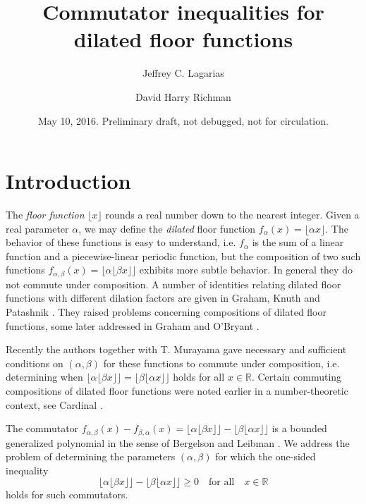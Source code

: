 \documentclass[12pt,letterpaper, reqno]{amsart}
\title{ Commutator inequalities for dilated floor functions}
\author{Jeffrey C. Lagarias}
\author{David Harry Richman}
\date{May 10, 2016. Preliminary draft, not debugged, not for circulation.}
\theoremstyle{definition}
\theoremstyle{remark}
\newcommand{\RR}{\ensuremath{\mathbb{R}}}
\newcommand{\floor}[1]{\lfloor{#1}\rfloor}
\begin{document}
\maketitle




%
%
\section{Introduction}
The {\em floor function}  
$\lfloor x \rfloor$
rounds a real number down to the nearest integer. 
Given a real parameter $\alpha$, we may define the {\em dilated} floor function $f_\alpha(x)= \floor{\alpha x}$.
The behavior of these functions is easy to understand, 
i.e. $f_\alpha$ is the sum of a linear function and a piecewise-linear periodic function, but the composition of two such functions 
$ f_{\alpha,\beta}(x) = \floor{\alpha \floor{\beta x}}$
exhibits more subtle behavior. In general they do not commute under composition.
A number of identities relating dilated floor functions with different dilation factors are given in 
Graham, Knuth and Patashnik \cite[Chap. 3]{GKP94}.
They raised problems  \cite[Research problem 50, p.101]{GKP94}
concerning compositions of dilated floor functions, some later addressed in  Graham and O'Bryant \cite{Go10}. 

Recently the  authors together with T. Murayama \cite{LMR16}  
gave necessary and sufficient conditions on $(\alpha, \beta)$ 
for these functions to commute 
under composition, i.e. determining when
 $\floor{\alpha \floor{\beta x}} =  \floor{\beta \floor{\alpha  x}}$ 
 holds for all $x \in \RR.$ Certain commuting compositions of dilated floor functions
 were noted earlier  in a number-theoretic context, 
 see Cardinal \cite[Lemma 6]{Car10}.

The commutator $f_{\alpha, \beta} (x) - f_{\beta, \alpha}(x)= \floor{\alpha \floor{\beta x}} -  \floor{\beta \floor{\alpha  x}}$ is a bounded generalized polynomial in
the sense of Bergelson and Leibman \cite{BerL07}. 
We address the problem of determining the parameters $(\alpha, \beta)$ for which  the one-sided inequality \begin{equation}\label{ineq}
\floor{\alpha \floor{\beta x}} -  \floor{\beta \floor{\alpha  x}} \ge 0 \quad \text{for all} \quad  x \in \RR
\end{equation}
holds for such commutators. 
\end{document}
